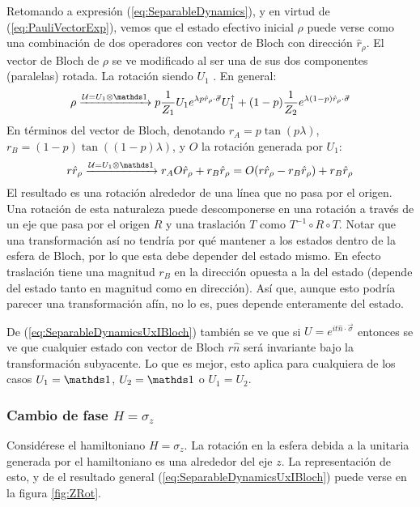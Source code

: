 Retomando a expresión (\ref{eq:SeparableDynamics}), y en virtud de (\ref{eq:PauliVectorExp}), vemos que el estado efectivo inicial $\rho$ puede verse como una combinación de dos operadores con vector de Bloch con dirección $\hat{r}_{\rho}$. El vector de Bloch de $\rho$ se ve modificado al ser una de sus dos componentes (paralelas) rotada. La rotación siendo $U_{1}$ . En general:
\begin{equation}\label{eq:SeparableDynamicsUxI}
    \rho\xrightarrow{\mcU=U_{1}\otimes \Id} p\frac{1}{Z_{1}}U_{1}e^{\lambda p\hat{r}_{\rho}\cdot\vec{\sigma}}U_{1}^{\dag}+(1-p)\frac{1}{Z_{2}}e^{\lambda(1-p)\hat{r}_{\rho}\cdot\vec{\sigma}}
\end{equation}
En términos del vector de Bloch, denotando $r_{A}=p\tan(p\lambda)$, $r_{B}=(1-p)\tan((1-p)\lambda)$, y $O$ la rotación generada por $U_{1}$:
\begin{equation}
    r\hat{r}_{\rho}\xrightarrow{\mcU=U_{1}\otimes \Id}r_{A}O\hat{r}_{\rho}+r_{B}\hat{r}_{\rho}=O(r\hat{r}_{\rho}-r_{B}\hat{r}_{\rho})+r_{B}\hat{r}_{\rho}
\end{equation}\label{eq:SeparableDynamicsUxIBloch}
El resultado es una rotación alrededor de una línea que no pasa por el origen. Una rotación de esta naturaleza puede descomponerse en una rotación a través de un eje que pasa por el origen $R$ y una traslación $T$ como $T^{-1}\circ R\circ T$. Notar que una transformación así no tendría por qué mantener a los estados dentro de la esfera de Bloch, por lo que esta debe depender del estado mismo. En efecto traslación tiene una magnitud $r_{B}$ en la dirección opuesta a la del estado (depende del estado tanto en magnitud como en dirección). Así que, aunque esto podría parecer una transformación afín, no lo es, pues depende enteramente del estado.

De (\ref{eq:SeparableDynamicsUxIBloch}) también se ve que si $U=e^{it\hat{n}\cdot\vec{\sigma}}$ entonces se ve que cualquier estado con vector de Bloch $r\hat{n}$ será invariante bajo la transformación subyacente. Lo que es mejor, esto aplica para cualquiera de los casos $U_{1}=\Id$, $U_{2}=\Id$ o $U_{1}=U_{2}$.

\subsubsection{Cambio de fase $H=\sigma_{z}$}
Considérese el hamiltoniano $H=\sigma_{z}$. La rotación en la esfera debida a la unitaria generada por el hamiltoniano es una alrededor del eje $z$. La representación de esto, y de el resultado general (\ref{eq:SeparableDynamicsUxIBloch}) puede verse en la figura \ref{fig:ZRot}.


